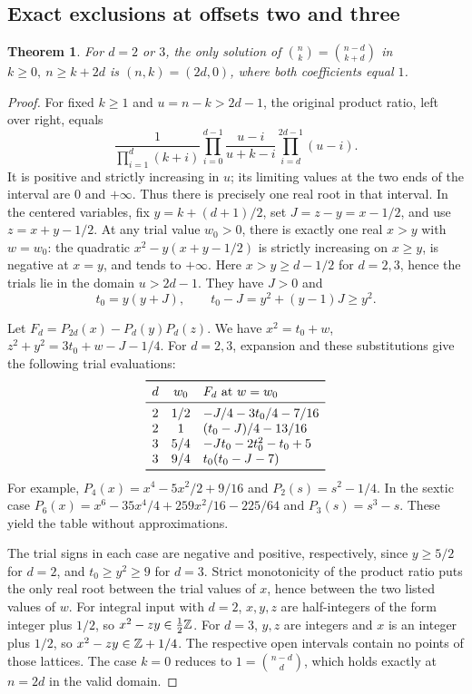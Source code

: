 \documentclass[11pt,a4paper]{article}
\newtheorem{SourceRbcKtheorem}{Theorem}
\begin{document}
\subsection{Exact exclusions at offsets two and three}
\begin{SourceRbcKtheorem}\label{R12K:thm:exact}
For \(d=2\) or \(3\), the only solution of \(\binom nk=\binom{n-d}{k+d}\) in \(k\ge0,\ n\ge k+2d\) is \((n,k)=(2d,0)\), where both coefficients equal \(1\).
\end{SourceRbcKtheorem}
\begin{proof}
For fixed \(k\ge1\) and \(u=n-k>2d-1\), the original product ratio, left over right, equals
\[
  \frac{1}{\prod_{i=1}^d(k+i)}
  \prod_{i=0}^{d-1}\frac{u-i}{u+k-i}
  \prod_{i=d}^{2d-1}(u-i).
\]
It is positive and strictly increasing in \(u\); its limiting values at the two ends of the interval are \(0\) and \(+\infty\). Thus there is precisely one real root in that interval. In the centered variables, fix \(y=k+(d+1)/2\), set \(J=z-y=x-1/2\), and use \(z=x+y-1/2\). At any trial value \(w_0>0\), there is exactly one real \(x>y\) with \(w=w_0\): the quadratic \(x^2-y(x+y-1/2)\) is strictly increasing on \(x\ge y\), is negative at \(x=y\), and tends to \(+\infty\). Here \(x>y\ge d-1/2\) for \(d=2,3\), hence the trials lie in the domain \(u>2d-1\). They have \(J>0\) and
\[
 t_0=y(y+J),\qquad t_0-J=y^2+(y-1)J\ge y^2.
\]

Let \(F_d=P_{2d}(x)-P_d(y)P_d(z)\). We have \(x^2=t_0+w\), \(z^2+y^2=3t_0+w-J-1/4\). For \(d=2,3\), expansion and these substitutions give the following trial evaluations:
\[
\begin{array}{ccl}
\toprule
d&w_0&F_d\text{ at }w=w_0\\
\midrule
2&1/2&-J/4-3t_0/4-7/16\\
2&1&(t_0-J)/4-13/16\\
3&5/4&-Jt_0-2t_0^2-t_0+5\\
3&9/4&t_0(t_0-J-7)\\
\bottomrule
\end{array}
\]
For example, \(P_4(x)=x^4-5x^2/2+9/16\) and \(P_2(s)=s^2-1/4\). In the sextic case \(P_6(x)=x^6-35x^4/4+259x^2/16-225/64\) and \(P_3(s)=s^3-s\). These yield the table without approximations.

The trial signs in each case are negative and positive, respectively, since \(y\ge5/2\) for \(d=2\), and \(t_0\ge y^2\ge9\) for \(d=3\). Strict monotonicity of the product ratio puts the only real root between the trial values of \(x\), hence between the two listed values of \(w\). For integral input with \(d=2\), \(x,y,z\) are half-integers of the form integer plus \(1/2\), so \(x^2-zy\in\frac12\mathbb Z\). For \(d=3\), \(y,z\) are integers and \(x\) is an integer plus \(1/2\), so \(x^2-zy\in\mathbb Z+1/4\). The respective open intervals contain no points of those lattices. The case \(k=0\) reduces to \(1=\binom{n-d}{d}\), which holds exactly at \(n=2d\) in the valid domain.
\end{proof}
\end{document}
